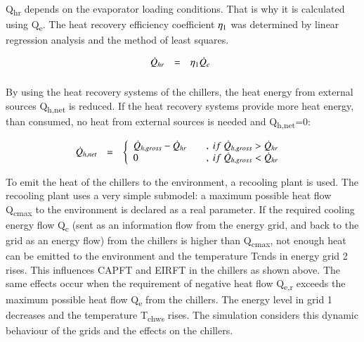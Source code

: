 \documentclass[3p,times,procedia,twocolumn,twoside]{elsarticle}
\begin{document}
Q\textsubscript{hr} depends on the evaporator loading conditions. That is why it is calculated using Q\textsubscript{e}. The heat recovery efficiency coefficient  $ \eta\textsubscript{1} $ was determined by linear regression analysis and the method of least squares.

\begin{equation}
\begin{array}{@{}lcl}
\displaystyle 

\dot{Q}_{hr} &=& \eta_{1}\dot{Q}_{e} 

\\[6pt]
\end{array}\vspace*{-12pt}
\end{equation}

By using the heat recovery systems of the chillers, the heat energy from external sources Q\textsubscript{h,net} is reduced. If the heat recovery systems provide more heat energy, than consumed, no heat from external sources is needed and Q\textsubscript{h,net}=0:

\begin{equation}
\begin{array}{@{}lcl}
\displaystyle 

\dot{Q}_{h,net} &=&  
\left\{ \begin{array}{lcl}
\dot{Q}_{h,gross} - \dot{Q}_{hr} & &,\ if\ \dot{Q}_{h,gross} > \dot{Q}_{hr} \\ 
0 & &,\ if\ \dot{Q}_{h,gross} < \dot{Q}_{hr}
\end{array}\right.

\\[6pt]
\end{array}\vspace*{-12pt}
\end{equation}

To emit the heat of the chillers to the environment, a recooling plant is used. The recooling plant uses a very simple submodel: a maximum possible heat flow Q\textsubscript{cmax} to the environment is declared as a real parameter. If the required cooling energy flow Q\textsubscript{c} (sent as an information flow from the energy grid, and back to the grid as an energy flow) from the chillers is higher than Q\textsubscript{cmax}, not enough heat can be emitted to the environment and the temperature Tcnds in energy grid 2 rises. This influences CAPFT and EIRFT in the chillers as shown above.
The same effects occur when the requirement of negative heat flow Q\textsubscript{e,r} exceeds the maximum possible heat flow Q\textsubscript{e} from the chillers. The energy level in grid 1 decreases and the temperature T\textsubscript{chws} rises. The simulation considers this dynamic behaviour of the grids and the effects on the chillers.
\end{document}

